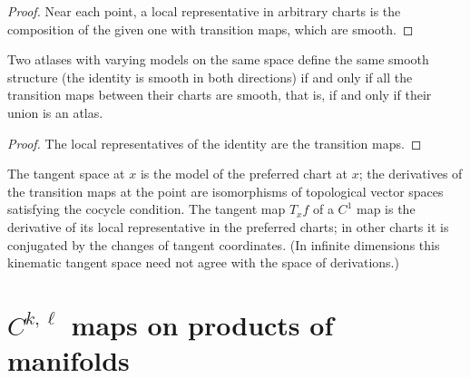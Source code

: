 \begin{proof}
  \leanok
  Near each point, a local representative in arbitrary charts is the composition of the given one
  with transition maps, which are smooth.
\end{proof}

\begin{proposition}
  \label{prop:varying-equivalent}
  \leanok
  Two atlases with varying models on the same space define the same smooth structure (the identity
  is smooth in both directions) if and only if all the transition maps between their charts are
  smooth, that is, if and only if their union is an atlas.
\end{proposition}

\begin{proof}
  \leanok
  The local representatives of the identity are the transition maps.
\end{proof}

\begin{definition}
  \label{def:varying-tangent}
  \leanok
  The tangent space at $x$ is the model of the preferred chart at $x$; the derivatives of the
  transition maps at the point are isomorphisms of topological vector spaces satisfying the
  cocycle condition. The tangent map $T_x f$ of a $C^1$ map is the derivative of its local
  representative in the preferred charts; in other charts it is conjugated by the changes of
  tangent coordinates. (In infinite dimensions this kinematic tangent space need not agree with
  the space of derivations.)
\end{definition}

\section{\texorpdfstring{$C^{k,\ell}$}{C\^{}\{k,l\}} maps on products of manifolds}

